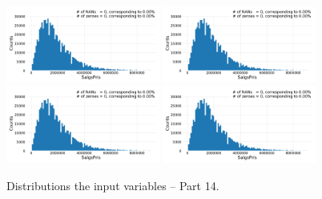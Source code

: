 \begin{figure}
  \subfloat{\qquad}
  \includegraphics[draft=false, width=0.45\textwidth, page=163, trim=15 0 15 0, clip]{figures/housing/overview_fig.pdf}\hfil
  \subfloat{\qquad}
  \includegraphics[draft=false, width=0.45\textwidth, page=164, trim=15 0 15 0, clip]{figures/housing/overview_fig.pdf}
  \subfloat{\qquad}
  \includegraphics[draft=false, width=0.45\textwidth, page=165, trim=15 0 15 0, clip]{figures/housing/overview_fig.pdf}\hfil
  \subfloat{\qquad}
  \includegraphics[draft=false, width=0.45\textwidth, page=166, trim=15 0 15 0, clip]{figures/housing/overview_fig.pdf}
  \caption[Distributions of the Input Variables -- Part 14]{Distributions the input variables -- Part 14.}
  \label{fig:h:variable_overview_all_14}
  \vspace{\abovecaptionskip}
\end{figure}


